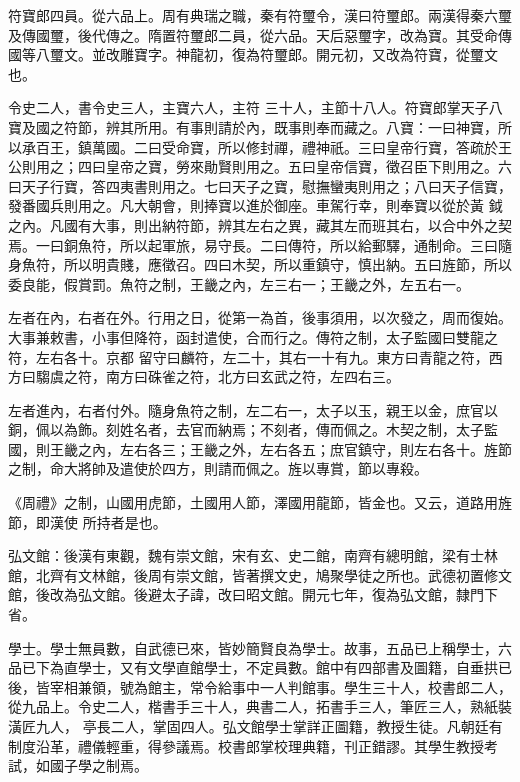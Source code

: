 \begin{pinyinscope}
 符寶郎四員。從六品上。周有典瑞之職，秦有符璽令，漢曰符璽郎。兩漢得秦六璽及傳國璽，後代傳之。隋置符璽郎二員，從六品。天后惡璽字，改為寶。其受命傳國等八璽文。並改雕寶字。神龍初，復為符璽郎。開元初，又改為符寶，從璽文也。



 令史二人，書令史三人，主寶六人，主符
 三十人，主節十八人。符寶郎掌天子八寶及國之符節，辨其所用。有事則請於內，既事則奉而藏之。八寶：一曰神寶，所以承百王，鎮萬國。二曰受命寶，所以修封禪，禮神祇。三曰皇帝行寶，答疏於王公則用之；四曰皇帝之寶，勞來勛賢則用之。五曰皇帝信寶，徵召臣下則用之。六曰天子行寶，答四夷書則用之。七曰天子之寶，慰撫蠻夷則用之；八曰天子信寶，發番國兵則用之。凡大朝會，則捧寶以進於御座。車駕行幸，則奉寶以從於黃
 鉞之內。凡國有大事，則出納符節，辨其左右之異，藏其左而班其右，以合中外之契焉。一曰銅魚符，所以起軍旅，易守長。二曰傳符，所以給郵驛，通制命。三曰隨身魚符，所以明貴賤，應徵召。四曰木契，所以重鎮守，慎出納。五曰旌節，所以委良能，假賞罰。魚符之制，王畿之內，左三右一；王畿之外，左五右一。



 左者在內，右者在外。行用之日，從第一為首，後事須用，以次發之，周而復始。大事兼敕書，小事但降符，函封遣使，合而行之。傳符之制，太子監國曰雙龍之符，左右各十。京都
 留守曰麟符，左二十，其右一十有九。東方曰青龍之符，西方曰騶虞之符，南方曰硃雀之符，北方曰玄武之符，左四右三。



 左者進內，右者付外。隨身魚符之制，左二右一，太子以玉，親王以金，庶官以銅，佩以為飾。刻姓名者，去官而納焉；不刻者，傳而佩之。木契之制，太子監國，則王畿之內，左右各三；王畿之外，左右各五；庶官鎮守，則左右各十。旌節之制，命大將帥及遣使於四方，則請而佩之。旌以專賞，節以專殺。



 《周禮》之制，山國用虎節，土國用人節，澤國用龍節，皆金也。又云，道路用旌節，即漢使
 所持者是也。



 弘文館：後漢有東觀，魏有崇文館，宋有玄、史二館，南齊有總明館，梁有士林館，北齊有文林館，後周有崇文館，皆著撰文史，鳩聚學徒之所也。武德初置修文館，後改為弘文館。後避太子諱，改曰昭文館。開元七年，復為弘文館，隸門下省。



 學士。學士無員數，自武德已來，皆妙簡賢良為學士。故事，五品已上稱學士，六品已下為直學士，又有文學直館學士，不定員數。館中有四部書及圖籍，自垂拱已後，皆宰相兼領，號為館主，常令給事中一人判館事。學生三十人，校書郎二人，從九品上。令史二人，楷書手三十人，典書二人，拓書手三人，筆匠三人，熟紙裝潢匠九人，
 亭長二人，掌固四人。弘文館學士掌詳正圖籍，教授生徒。凡朝廷有制度沿革，禮儀輕重，得參議焉。校書郎掌校理典籍，刊正錯謬。其學生教授考試，如國子學之制焉。




\end{pinyinscope}

